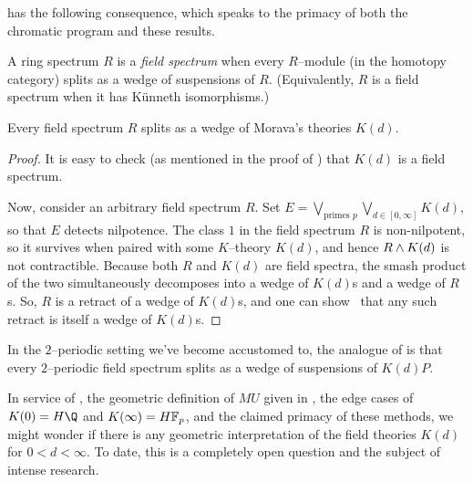  has the following consequence, which speaks to the primacy of both the chromatic program and these results.

\begin{definition}
A ring spectrum \(R\) is a \textit{field spectrum} when every \(R\)--module (in the homotopy category) splits as a wedge of suspensions of \(R\).  (Equivalently, \(R\) is a field spectrum when it has K\"unneth isomorphisms.)
\end{definition}

\begin{corollary}\label{FieldSpectraAreKTheories}
Every field spectrum \(R\) splits as a wedge of Morava's theories \(K(d)\).
\end{corollary}
\begin{proof}
It is easy to check (as mentioned in the proof of ) that \(K(d)\) is a field spectrum.

Now, consider an arbitrary field spectrum \(R\).  Set \(E = \bigvee_{\text{primes $p$}} \bigvee_{d \in [0, \infty]} K(d)\), so that \(E\) detects nilpotence.  The class \(1\) in the field spectrum \(R\) is non-nilpotent, so it survives when paired with some \(K\)--theory \(K(d)\), and hence \(R \wedge K(d)\) is not contractible.  Because both \(R\) and \(K(d)\) are field spectra, the smash product of the two simultaneously decomposes into a wedge of \(K(d)\)s and a wedge of \(R\)s.  So, \(R\) is a retract of a wedge of \(K(d)\)s, and one can show~\cite[1.10--1.12]{HopkinsSmith} that any such retract is itself a wedge of \(K(d)\)s.
\end{proof}

\begin{remark}
In the \(2\)--periodic setting we've become accustomed to, the analogue of  is that every \(2\)--periodic field spectrum splits as a wedge of suspensions of \(K(d)P\).
\end{remark}

\begin{remark}
In service of , the geometric definition of \(MU\) given in , the edge cases of \(K(0) = H\Q\) and \(K(\infty) = \HFp\), and the claimed primacy of these methods, we might wonder if there is any geometric interpretation of the field theories \(K(d)\) for \(0 < d < \infty\).  To date, this is a completely open question and the subject of intense research.
\end{remark}

